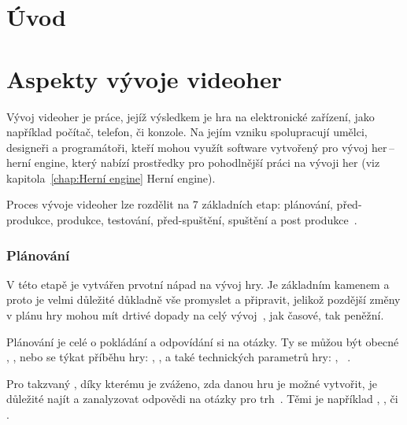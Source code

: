 
%

\chapter{Úvod}

\chapter{Aspekty vývoje videoher}
Vývoj videoher je práce, jejíž výsledkem je hra na elektronické zařízení, jako například počítač, telefon, či konzole. Na jejím vzniku spolupracují umělci, designeři a programátoři, kteří mohou využít software vytvořený pro vývoj her\,--\,herní engine, který nabízí prostředky pro pohodlnější práci na vývoji her (viz kapitola~\ref{chap:Herní engine} Herní engine).

Proces vývoje videoher lze rozdělit na 7 základních etap: plánování, před-produkce, produkce, testování, před-spuštění, spuštění a post produkce~\cite{g2_game_development}.
\subsection*{Plánování}
V této etapě je vytvářen prvotní nápad na vývoj hry. Je základním kamenem a proto je velmi důležité důkladně vše promyslet a připravit, jelikož pozdější změny v plánu hry mohou mít drtivé dopady na celý vývoj~\cite{GameMaker_development}, jak časové, tak peněžní. 

Plánování je celé o pokládání a odpovídání si na otázky. Ty se můžou být obecné , , nebo se týkat příběhu hry: , ,  a také technických parametrů hry: , ~\cite{g2_game_development}.

Pro takzvaný , díky kterému je zváženo, zda danou hru je možné vytvořit, je důležité najít a zanalyzovat odpovědi na otázky pro trh~\cite{GameMaker_development}. Těmi je například , ,  či .

